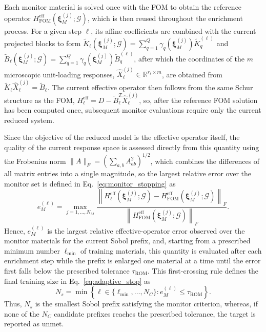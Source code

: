 \documentclass[pdflatex,sn-basic,Numbered]{sn-jnl}
\newcommand{\R}{\mathbb{R}}
\newcommand{\G}{\mathcal{G}}
\newcommand{\Hfom}{H^{\mathrm{eff}}_{\mathrm{FOM}}}
\begin{document}
Each monitor material is solved once with the FOM to obtain the reference
operator \(\Hfom(\boldsymbol\xi_M^{(j)};\G)\), which is then reused throughout
the enrichment process. For a given step \(\ell\), its affine coefficients
are combined with the current projected blocks to form
\(\widetilde K_\ell(\boldsymbol\xi_M^{(j)};\G)
=\sum_{q=1}^{Q}\gamma_q(\boldsymbol\xi_M^{(j)})
\widetilde K_q^{(\ell)}\) and
\(\widetilde B_\ell(\boldsymbol\xi_M^{(j)};\G)
=\sum_{q=1}^{Q}\gamma_q(\boldsymbol\xi_M^{(j)})
\widetilde B_q^{(\ell)}\), after which the coordinates of the \(m\)
microscopic unit-loading responses,
\(\widehat X_\ell^{(j)}\in\R^{r_\ell\times m}\), are obtained from
\(\widetilde K_\ell\widehat X_\ell^{(j)}=\widetilde B_\ell\). The current
effective operator then follows from the same Schur structure as the FOM,
\(H_\ell^{\mathrm{eff}}
=D-\widetilde B_\ell^T\widehat X_\ell^{(j)}\), so, after the reference FOM
solution has been computed once, subsequent monitor evaluations require only
the current reduced system.

Since the objective of the reduced model is the effective operator itself,
the quality of the current response space is assessed directly from this
quantity using the Frobenius norm
\(\|A\|_F=(\sum_{a,b}A_{ab}^2)^{1/2}\), which combines the differences of all
matrix entries into a single magnitude, so the largest relative error over the
monitor set is defined in Eq.~\eqref{eq:monitor_stopping} as
\begin{equation}
\label{eq:monitor_stopping}
e_M^{(\ell)}
=
\max_{j=1,\ldots,N_M}
\frac{
\left\|
H_\ell^{\mathrm{eff}}(\boldsymbol\xi_M^{(j)};\G)
-
\Hfom(\boldsymbol\xi_M^{(j)};\G)
\right\|_F
}{
\left\|
\Hfom(\boldsymbol\xi_M^{(j)};\G)
\right\|_F
}.
\end{equation}
Hence, \(e_M^{(\ell)}\) is the largest relative effective-operator error
observed over the monitor materials for the current Sobol prefix, and,
starting from a prescribed minimum number \(\ell_{\min}\) of training
materials, this quantity is evaluated after each enrichment step while the
prefix is enlarged one material at a time until the error first falls below
the prescribed tolerance \(\tau_{\mathrm{ROM}}\). This first-crossing rule
defines the final training size in Eq.~\eqref{eq:adaptive_stop} as
\begin{equation}
\label{eq:adaptive_stop}
N_s
=
\min
\left\{
\ell\in\{\ell_{\min},\ldots,N_C\}:
e_M^{(\ell)}
\leq
\tau_{\mathrm{ROM}}
\right\}.
\end{equation}
Thus, \(N_s\) is the smallest Sobol prefix satisfying the monitor criterion,
whereas, if none of the \(N_C\) candidate prefixes reaches the prescribed
tolerance, the target is reported as unmet.
\end{document}
